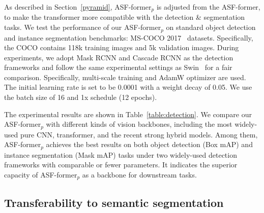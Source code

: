\documentclass[lettersize,journal]{IEEEtran}
\begin{document}
As described in Section~\ref{pyramid}, ASF-former$_p$ is adjusted from the ASF-former, to make the transformer more compatible with the detection \& segmentation tasks. We test the performance of our ASF-former$_p$ on standard object detection and instance segmentation benchmarks: MS-COCO 2017~\cite{Lin2014Mscoco} datasets. Specifically, the COCO contains 118k training images and 5k validation images. During experiments, we adopt Mask RCNN and Cascade RCNN as the detection frameworks and follow the same experimental settings as Swin~\cite{liu2021Swin} for a fair comparison. Specifically, multi-scale training and AdamW optimizer are used. The initial learning rate is set to be 0.0001 with a weight decay of 0.05. We use the batch size of 16 and 1x schedule (12 epochs).

The experimental results are shown in Table~\ref{table:detection}. We compare our ASF-former$_p$ with different kinds of vision backbones, including the most widely-used pure CNN, transformer, and the recent strong hybrid models. Among them, ASF-former$_p$ achieves the best results on both object detection (Box mAP) and instance segmentation (Mask mAP) tasks under two widely-used detection frameworks with comparable or fewer parameters. It indicates the superior capacity of ASF-former$_p$ as a backbone for downstream tasks.

\subsection{Transferability to semantic segmentation}
\label{segmentation}
\end{document}
